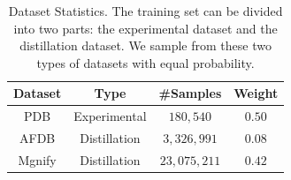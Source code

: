 \documentclass[]{bytedance_seed}
\newcommand{\todoq}[2][]{\todo[size=\scriptsize,color=orange!20!white,#1]{Quanquan: #2}}
\begin{document}
\begin{table}[t]
    \centering
    \caption{Dataset Statistics. The training set can be divided into two parts: the experimental dataset and the distillation dataset. We sample from these two types of datasets with equal probability.}
    \label{tab:data_stats}
    \begin{tabular}{cccc}
        \toprule
        \textbf{Dataset} & \textbf{Type} & \textbf{\#Samples} & \textbf{Weight} \\
        \midrule
        PDB & Experimental & $180,540$ & $0.50$ \\
        AFDB & Distillation & $3,326,991$ & $0.08$ \\
        Mgnify & Distillation & $23,075,211$ & $0.42$ \\
        \bottomrule
    \end{tabular}
\end{table}
\end{document}
